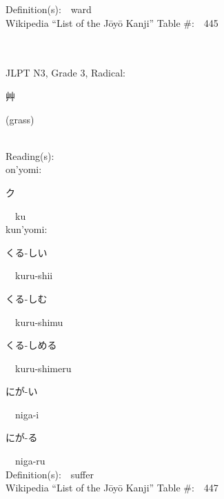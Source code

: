 \begin{multicols}{2}
Definition(s):\ \ ward \\
Wikipedia ``List of the J\=oy\=o Kanji'' Table \#:\ \ 445 \\
\ \ \\
{\fontsize{34pt}{40pt}  }\ \ \\  %
{JLPT N3, Grade 3, Radical:\ \ {\begin{CJK}{UTF8}{min} 艸 \end{CJK}} (grass) } \\
Reading(s):\ \ \\
{\hspace*{1em}}on'yomi:\ \ \\
{\hspace*{2em}}{\begin{CJK}{UTF8}{min} ク \end{CJK}}\ \ ku\ \ \\
{\hspace*{1em}}kun'yomi:\ \ \\
{\hspace*{2em}}{\begin{CJK}{UTF8}{min} くる-しい \end{CJK}}\ \ kuru-shii\ \ \\
{\hspace*{2em}}{\begin{CJK}{UTF8}{min} くる-しむ \end{CJK}}\ \ kuru-shimu\ \ \\
{\hspace*{2em}}{\begin{CJK}{UTF8}{min} くる-しめる \end{CJK}}\ \ kuru-shimeru\ \ \\
{\hspace*{2em}}{\begin{CJK}{UTF8}{min} にが-い \end{CJK}}\ \ niga-i\ \ \\
{\hspace*{2em}}{\begin{CJK}{UTF8}{min} にが-る \end{CJK}}\ \ niga-ru\ \ \\
Definition(s):\ \ suffer \\
Wikipedia ``List of the J\=oy\=o Kanji'' Table \#:\ \ 447 \\
\ \ \\

\end{multicols}
